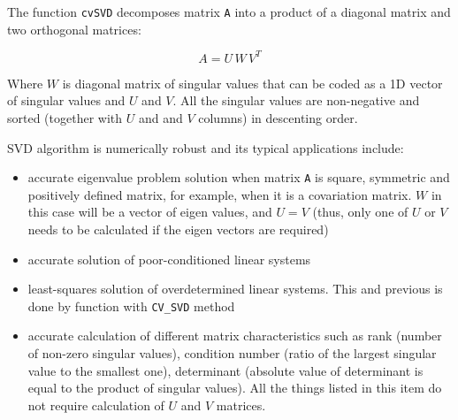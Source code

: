 \begin{description}
\end{description}

The function \texttt{cvSVD} decomposes matrix \texttt{A} into a product of a diagonal matrix and two orthogonal matrices:

\[
A=U \, W \, V^T
\]

Where $W$ is diagonal matrix of singular values that can be coded as a
1D vector of singular values and $U$ and $V$. All the singular values
are non-negative and sorted (together with $U$ and and $V$ columns)
in descenting order.

SVD algorithm is numerically robust and its typical applications include:

\begin{itemize}
  \item accurate eigenvalue problem solution when matrix \texttt{A}
  is square, symmetric and positively defined matrix, for example, when
  it is a covariation matrix. $W$ in this case will be a vector
  of eigen values, and $U = V$
  (thus, only one of $U$ or $V$ needs to be calculated if
  the eigen vectors are required)
  \item accurate solution of poor-conditioned linear systems
  \item least-squares solution of overdetermined linear systems. This and previous is done by  function with \texttt{CV\_SVD} method
  \item accurate calculation of different matrix characteristics such as rank (number of non-zero singular values), condition number (ratio of the largest singular value to the smallest one), determinant (absolute value of determinant is equal to the product of singular values). All the things listed in this item do not require calculation of $U$ and $V$ matrices.
\end{itemize}

